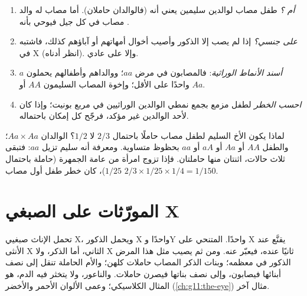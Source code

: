 \begin{method}\label{met:g11:genes-and-disease:analyse}
\begin{enumerate}
  \item \emph{ أم ؟} طفل مصاب لوالدين سليمين يعني أنه 
        (فالوالدان حاملان). أما مصاب له والد مصاب في كل جيل فيوحي بأنه
        .
  \item \emph{على  جنسي؟} إذا لم يصب إلا الذكور وأصيب أخوال
        أمهاتهم أو آباؤهم كذلك، فاشتبه في  X (انظر أدناه). وإلا
         على  عادي.
  \item \emph{أسند الأنماط الوراثية}: فالمصابون في مرض  $aa$؛
        ووالداهم وأطفالهم يحملون $a$ واحدًا على الأقل؛ وإخوة المصاب
        السليمون $AA$ أو $Aa$.
  \item \emph{احسب الخطر} لطفل مزمع بجمع نمطي الوالدين الوراثيين في
        مربع بونيت؛ وإذا كان  لأحد الوالدين غير مؤكد،
        فرجّح كل إمكان باحتماله.
\end{enumerate}
\end{method}

\begin{example}[الثلثان]\label{ex:g11:genes-and-disease:twothirds}
لماذا يكون الأخ السليم لطفل مصاب حاملًا باحتمال $2/3$ لا $1/2$؟
الوالدان $Aa \times Aa$؛ والطفل $AA$ أو $Aa$ أو $aA$ أو $aa$ بحظوظ
متساوية. ومعرفة أنه سليم تزيل $aa$: فتبقى ثلاث حالات، اثنتان منها
حاملتان. فإذا تزوج امرأة من عامة الجمهرة (حاملة باحتمال $1/25$)، كان
خطر طفل أول مصاب $2/3 \times 1/25 \times 1/4 = 1/150$.
\end{example}

\section{المورّثات على الصبغي X}

\begin{proposition}\label{prop:g11:genes-and-disease:xlinked}
تحمل الإناث صبغيي X، ويحمل الذكور X واحدًا وY واحدًا.  المتنحي
على  X يقنَّع عند الأنثى  X الثاني، أما الذكر، ولا  X
ثانيًا عنده، فيعبّر عنه. ومن ثم يصيب مثل هذا المرض الذكور في معظمه؛
وبنات الذكر المصاب حاملات كلهن؛ والأم الحاملة تنقل  إلى نصف
أبنائها فيصابون، وإلى نصف بناتها فيصرن حاملات. والناعور، ولا يتخثر
فيه الدم، هو المثال الكلاسيكي؛ وعمى الألوان الأحمر والأخضر
(\cref{ch:g11:the-eye}) مثال آخر.
\end{proposition}
\admitted

